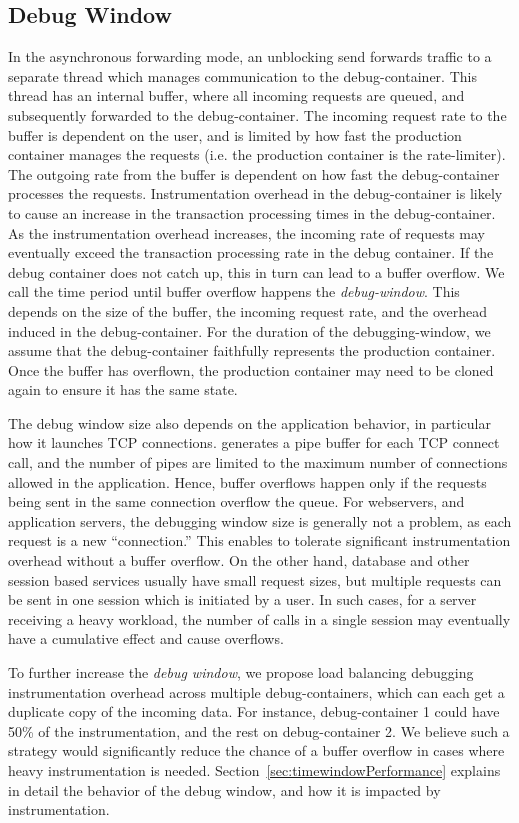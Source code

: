 
\subsection{Debug Window}
\label{sec:window}

In the asynchronous forwarding mode, an unblocking send forwards traffic to a separate thread which manages communication to the debug-container. 
This thread has an internal buffer, where all incoming requests are queued, and subsequently forwarded to the debug-container. 
The incoming request rate to the buffer is dependent on the user, and is limited by how fast the production container manages the requests (i.e. the production container is the rate-limiter).
The outgoing rate from the buffer is dependent on how fast the debug-container processes the requests.
Instrumentation overhead in the debug-container is likely to cause an increase in the transaction processing times in the debug-container.
As the instrumentation overhead increases, the incoming rate of requests may eventually exceed the transaction processing rate in the debug container.
If the debug container does not catch up, this in turn can lead to a buffer overflow. We call the time period until buffer overflow happens the \emph{debug-window}.
This depends on the size of the buffer, the incoming request rate, and the overhead induced in the debug-container. 
For the duration of the debugging-window, we assume that the debug-container faithfully represents the production container. 
Once the buffer has overflown, the production container may need to be cloned again to ensure it has the same state.

The debug window size also depends on the application behavior, in particular how it launches TCP connections. 
\parikshan generates a pipe buffer for each TCP connect call, and the number of pipes are limited to the maximum number of connections allowed in the application.
Hence, buffer overflows happen only if the requests being sent in the same connection overflow the queue.
For webservers, and application servers, the debugging window size is generally not a problem, as each request is a new ``connection.''
This enables \parikshan to tolerate significant instrumentation overhead without a buffer overflow.
On the other hand, database and other session based services usually have small request sizes, but multiple requests can be sent in one session which is initiated by a user. 
In such cases, for a server receiving a heavy workload, the number of calls in a single session may eventually have a cumulative effect and cause overflows.

To further increase the \emph{debug window}, we propose load balancing debugging instrumentation overhead across multiple debug-containers, which can each get a duplicate copy of the incoming data. 
For instance, debug-container 1 could have 50\% of the instrumentation, and the rest on debug-container 2.
We believe such a strategy would significantly reduce the chance of a buffer overflow in cases where heavy instrumentation is needed.
Section~\ref{sec:timewindowPerformance} explains in detail the behavior of the debug window, and how it is impacted by instrumentation.
